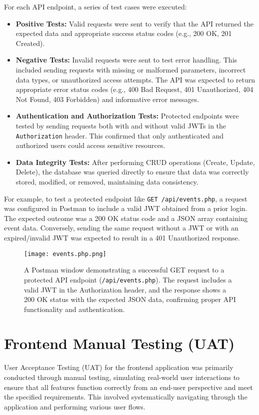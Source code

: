 \documentclass{report}
\begin{document}
For each API endpoint, a series of test cases were executed:
\begin{itemize}
    \item \textbf{Positive Tests:} Valid requests were sent to verify that the API returned the expected data and appropriate success status codes (e.g., 200 OK, 201 Created).
    \item \textbf{Negative Tests:} Invalid requests were sent to test error handling. This included sending requests with missing or malformed parameters, incorrect data types, or unauthorized access attempts. The API was expected to return appropriate error status codes (e.g., 400 Bad Request, 401 Unauthorized, 404 Not Found, 403 Forbidden) and informative error messages.
    \item \textbf{Authentication and Authorization Tests:} Protected endpoints were tested by sending requests both with and without valid JWTs in the \texttt{Authorization} header. This confirmed that only authenticated and authorized users could access sensitive resources.
    \item \textbf{Data Integrity Tests:} After performing CRUD operations (Create, Update, Delete), the database was queried directly to ensure that data was correctly stored, modified, or removed, maintaining data consistency.
\end{itemize}
For example, to test a protected endpoint like \texttt{GET /api/events.php}, a request was configured in Postman to include a valid JWT obtained from a prior login. The expected outcome was a 200 OK status code and a JSON array containing event data. Conversely, sending the same request without a JWT or with an expired/invalid JWT was expected to result in a 401 Unauthorized response.

\begin{figure}[htbp]
    \centering
    \texttt{[image: events.php.png]} %
    \caption{A Postman window demonstrating a successful GET request to a protected API endpoint (\texttt{/api/events.php}). The request includes a valid JWT in the Authorization header, and the response shows a 200 OK status with the expected JSON data, confirming proper API functionality and authentication.}
    \label{fig:postman_request}
\end{figure}

\section{Frontend Manual Testing (UAT)}
\label{sec:frontend_manual_testing}
User Acceptance Testing (UAT) for the frontend application was primarily conducted through manual testing, simulating real-world user interactions to ensure that all features function correctly from an end-user perspective and meet the specified requirements. This involved systematically navigating through the application and performing various user flows.
\end{document}
